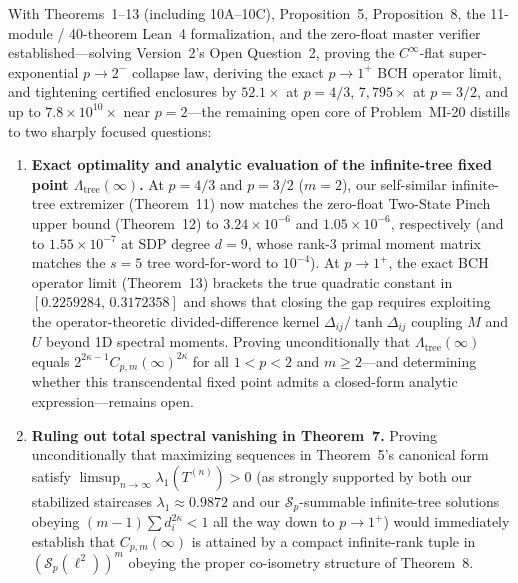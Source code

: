 \documentclass[10pt,letterpaper]{article}
\newcommand{\Sp}{\mathcal{S}_p}
\begin{document}
With Theorems~1--13 (including 10A--10C), Proposition~5, Proposition~8, the 11-module / 40-theorem Lean~4 formalization, and the zero-float master verifier established—solving Version~2's Open Question~2, proving the $C^\infty$-flat super-exponential $p \to 2^-$ collapse law, deriving the exact $p \to 1^+$ BCH operator limit, and tightening certified enclosures by $52.1\times$ at $p = 4/3$, $7{,}795\times$ at $p = 3/2$, and up to $7.8\times 10^{10}\times$ near $p = 2$—the remaining open core of Problem~MI-20 distills to two sharply focused questions:
\begin{enumerate}[leftmargin=1.6em,itemsep=3pt]
  \item \textbf{Exact optimality and analytic evaluation of the infinite-tree fixed point $\Lambda_{\mathrm{tree}}(\infty)$.} At $p = 4/3$ and $p = 3/2$ ($m = 2$), our self-similar infinite-tree extremizer (Theorem~11) now matches the zero-float Two-State Pinch upper bound (Theorem~12) to $3.24 \times 10^{-6}$ and $1.05 \times 10^{-6}$, respectively (and to $1.55 \times 10^{-7}$ at SDP degree $d = 9$, whose rank-$3$ primal moment matrix matches the $s = 5$ tree word-for-word to $10^{-4}$). At $p \to 1^+$, the exact BCH operator limit (Theorem~13) brackets the true quadratic constant in $[0.2259284,\, 0.3172358]$ and shows that closing the gap requires exploiting the operator-theoretic divided-difference kernel $\Delta_{ij}/\tanh\Delta_{ij}$ coupling $M$ and $U$ beyond 1D spectral moments. Proving unconditionally that $\Lambda_{\mathrm{tree}}(\infty)$ equals $2^{2\kappa-1} C_{p,m}(\infty)^{2\kappa}$ for all $1 < p < 2$ and $m \ge 2$—and determining whether this transcendental fixed point admits a closed-form analytic expression—remains open.
  \item \textbf{Ruling out total spectral vanishing in Theorem~7.} Proving unconditionally that maximizing sequences in Theorem~5's canonical form satisfy $\limsup_{n\to\infty}\lambda_1(T^{(n)}) > 0$ (as strongly supported by both our stabilized staircases $\lambda_1 \approx 0.9872$ and our $\Sp$-summable infinite-tree solutions obeying $(m-1)\sum d_i^{2\kappa} < 1$ all the way down to $p \to 1^+$) would immediately establish that $C_{p,m}(\infty)$ is attained by a compact infinite-rank tuple in $(\Sp(\ell^2))^m$ obeying the proper co-isometry structure of Theorem~8.
\end{enumerate}
\end{document}
